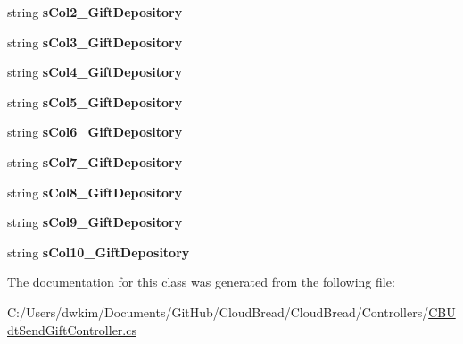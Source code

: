 \begin{DoxyCompactItemize}
\item 
string {\bfseries s\+Col2\+\_\+\+Gift\+Depository}\hypertarget{a00116_ad859eb007168c0d7c58218c99cf0f0ef}{}\label{a00116_ad859eb007168c0d7c58218c99cf0f0ef}

\item 
string {\bfseries s\+Col3\+\_\+\+Gift\+Depository}\hypertarget{a00116_ab47b0f7677cfca7070817236e4bccff7}{}\label{a00116_ab47b0f7677cfca7070817236e4bccff7}

\item 
string {\bfseries s\+Col4\+\_\+\+Gift\+Depository}\hypertarget{a00116_aedb6044ea066996091241883733e7022}{}\label{a00116_aedb6044ea066996091241883733e7022}

\item 
string {\bfseries s\+Col5\+\_\+\+Gift\+Depository}\hypertarget{a00116_a383d62335776ad953bb1aec6ed99997b}{}\label{a00116_a383d62335776ad953bb1aec6ed99997b}

\item 
string {\bfseries s\+Col6\+\_\+\+Gift\+Depository}\hypertarget{a00116_ae71af611255d884146f15fa29b208d97}{}\label{a00116_ae71af611255d884146f15fa29b208d97}

\item 
string {\bfseries s\+Col7\+\_\+\+Gift\+Depository}\hypertarget{a00116_a405807a7381ca98dffd16c910cf93cc1}{}\label{a00116_a405807a7381ca98dffd16c910cf93cc1}

\item 
string {\bfseries s\+Col8\+\_\+\+Gift\+Depository}\hypertarget{a00116_af6a3265615abb7c16f277540745b38dd}{}\label{a00116_af6a3265615abb7c16f277540745b38dd}

\item 
string {\bfseries s\+Col9\+\_\+\+Gift\+Depository}\hypertarget{a00116_ad5a38634c4af68aefb31951c1fa46441}{}\label{a00116_ad5a38634c4af68aefb31951c1fa46441}

\item 
string {\bfseries s\+Col10\+\_\+\+Gift\+Depository}\hypertarget{a00116_a720ea7f0ce2a0d66e22b803fd67473d8}{}\label{a00116_a720ea7f0ce2a0d66e22b803fd67473d8}

\end{DoxyCompactItemize}


The documentation for this class was generated from the following file\+:\begin{DoxyCompactItemize}
\item 
C\+:/\+Users/dwkim/\+Documents/\+Git\+Hub/\+Cloud\+Bread/\+Cloud\+Bread/\+Controllers/\hyperlink{a00233}{C\+B\+Udt\+Send\+Gift\+Controller.\+cs}\end{DoxyCompactItemize}
